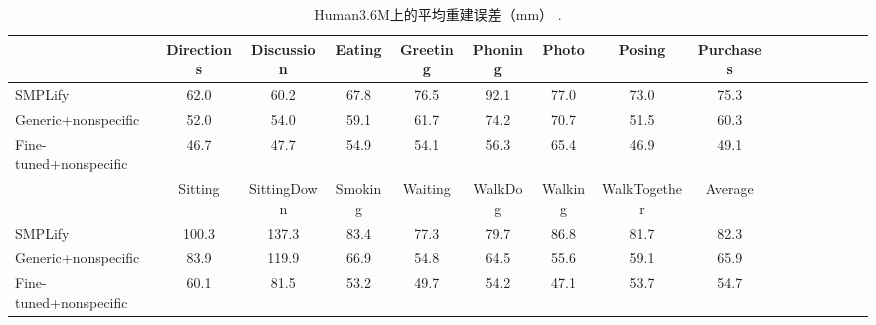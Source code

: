 \begin{table}
\caption{Human3.6M上的平均重建误差（mm） \cite{ionescu2014human}.}
\centering
\renewcommand{\arraystretch}{1.35}
\begin{tabular}{l*{15}{c}}
\toprule
 & Directions & Discussion & Eating & Greeting & Phoning & Photo & Posing & Purchases \\
\toprule
SMPLify \cite{bogo2016keep} & 62.0 & 60.2 & 67.8 & 76.5 & 92.1 & 77.0 & 73.0 & 75.3 \\
Generic+nonspecific & 52.0 &         54.0 &         59.1 &         61.7 &         74.2 &         70.7 &         51.5 &         60.3 \\
Fine-tuned+nonspecific & 46.7 &         47.7 &         54.9 &         54.1 &         56.3 &         65.4 &         46.9 &         49.1 \\
\toprule
 & Sitting & SittingDown & Smoking & Waiting & WalkDog & Walking & WalkTogether & Average \\
\toprule
SMPLify \cite{bogo2016keep} & 100.3 & 137.3 & 83.4 & 77.3 & 79.7 & 86.8 & 81.7 & 82.3 \\
Generic+nonspecific & 83.9 &        119.9 &         66.9 &         54.8 &         64.5 &         55.6 &         59.1 &         65.9 \\
Fine-tuned+nonspecific & 60.1 &         81.5 &         53.2 &         49.7 &         54.2 &         47.1 &         53.7 &         54.7 \\
\toprule
\end{tabular}
\label{tab:h36m1}
\end{table}

